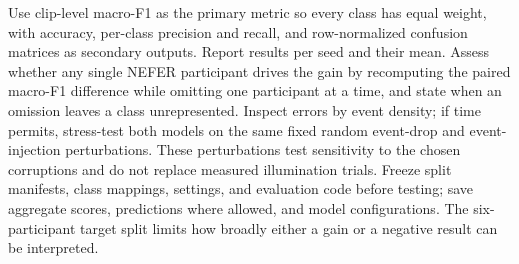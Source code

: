 Use clip-level macro-F1 as the primary metric so every class has equal weight, with accuracy, per-class precision and recall, and row-normalized confusion matrices as secondary outputs. Report results per seed and their mean. Assess whether any single NEFER participant drives the gain by recomputing the paired macro-F1 difference while omitting one participant at a time, and state when an omission leaves a class unrepresented. Inspect errors by event density; if time permits, stress-test both models on the same fixed random event-drop and event-injection perturbations. These perturbations test sensitivity to the chosen corruptions and do not replace measured illumination trials. Freeze split manifests, class mappings, settings, and evaluation code before testing; save aggregate scores, predictions where allowed, and model configurations. The six-participant target split limits how broadly either a gain or a negative result can be interpreted.
